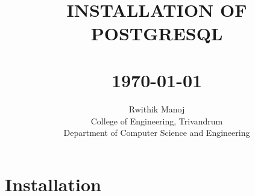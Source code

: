 \documentclass[10pt,a4paper,titlepage]{report}
\begin{document}
{\selectfont
\title{ \normalsize \textsc{}
\\ [2.0cm]
\hrulefill \\
\LARGE \textbf{\uppercase{installation of postgresql}\\
\hrulefill \\ [0.5cm]
\normalsize \today \vspace*{5\baselineskip}}
}

\date{}

\author{
	Rwithik Manoj \\ 
	College of Engineering, Trivandrum \\
	Department of Computer Science and Engineering }

\maketitle
\tableofcontents
\newpage

\sectionfont{\scshape}

\chapter{Installation}

}
\end{document}
